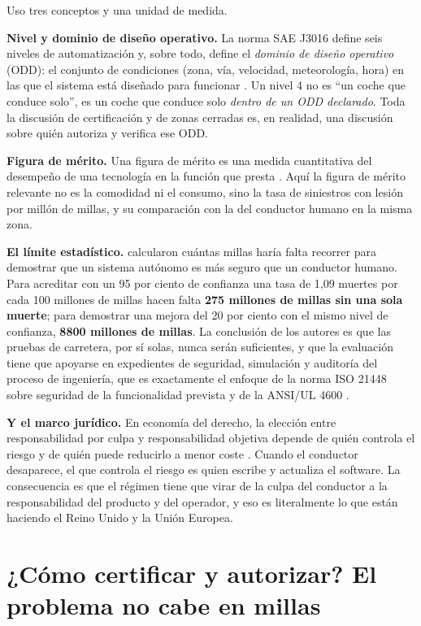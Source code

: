 \documentclass[11pt,letterpaper]{article}
\begin{document}
Uso tres conceptos y una unidad de medida.

\textbf{Nivel y dominio de diseño operativo.} La norma SAE J3016 define seis
niveles de automatización y, sobre todo, define el \emph{dominio de diseño
operativo} (ODD): el conjunto de condiciones (zona, vía, velocidad,
meteorología, hora) en las que el sistema está diseñado para funcionar
\parencite{sae2021}. Un nivel 4 no es \enquote{un coche que conduce solo}, es un
coche que conduce solo \emph{dentro de un ODD declarado}. Toda la discusión de
certificación y de zonas cerradas es, en realidad, una discusión sobre quién
autoriza y verifica ese ODD.

\textbf{Figura de mérito.} Una figura de mérito es una medida cuantitativa del
desempeño de una tecnología en la función que presta
\parencite{deweck2022}. Aquí la figura de mérito relevante no es la comodidad ni
el consumo, sino la tasa de siniestros con lesión por millón de millas, y su
comparación con la del conductor humano en la misma zona.

\textbf{El límite estadístico.} \textcite{kalra2016} calcularon cuántas millas
haría falta recorrer para demostrar que un sistema autónomo es más seguro que un
conductor humano. Para acreditar con un 95 por ciento de confianza una tasa de
1,09 muertes por cada 100 millones de millas hacen falta \textbf{275 millones de
millas sin una sola muerte}; para demostrar una mejora del 20 por ciento con el
mismo nivel de confianza, \textbf{\num{8800} millones de millas}. La conclusión
de los autores es que las pruebas de carretera, por sí solas, nunca serán
suficientes, y que la evaluación tiene que apoyarse en expedientes de seguridad,
simulación y auditoría del proceso de ingeniería, que es exactamente el enfoque
de la norma ISO 21448 sobre seguridad de la funcionalidad prevista y de la
ANSI/UL 4600 \parencite{iso21448,ul4600,koopman2017}.

\textbf{Y el marco jurídico.} En economía del derecho, la elección entre
responsabilidad por culpa y responsabilidad objetiva depende de quién controla el
riesgo y de quién puede reducirlo a menor coste \parencite{shavell1980}. Cuando
el conductor desaparece, el que controla el riesgo es quien escribe y actualiza
el software. La consecuencia es que el régimen tiene que virar de la culpa del
conductor a la responsabilidad del producto y del operador, y eso es literalmente
lo que están haciendo el Reino Unido y la Unión Europea.

\section{¿Cómo certificar y autorizar? El problema no cabe en millas}
\end{document}

